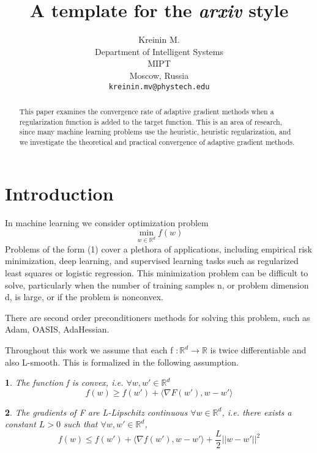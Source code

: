 \documentclass{article}
\title{A template for the \emph{arxiv} style}
\author{ Kreinin M. \\
	Department of Intelligent Systems\\
	MIPT\\
	Moscow, Russia \\
	\texttt{kreinin.mv@phystech.edu} \\
}
\date{}
\makeatletter
\newtheorem*{assumption*}{\assumptionnumber}
\providecommand{\assumptionnumber}{}
\newenvironment{assumption}[2]
 {%
  \renewcommand{\assumptionnumber}{\textbf{Assumption} #1 ({#2})}%
  \begin{assumption*}%
  \protected@edef\@currentlabel{#1-#2}%
 }
 {%
  \end{assumption*}
 }
\makeatother
\begin{document}
\maketitle

\begin{abstract}
	This paper examines the convergence rate of adaptive gradient methods when a regularization function is added to the target function. This is an area of research, since many machine learning problems use the heuristic, heuristic regularization, and we investigate the theoretical and practical convergence of adaptive gradient methods.
\end{abstract}


\section{Introduction}
In machine learning we consider optimization problem
\begin{equation*}
	\min_{w \in \mathbb{R}^d} f(w)
\end{equation*}
Problems of the form (1) cover a plethora of applications, including empirical risk minimization,
deep learning, and supervised learning tasks such as regularized least squares or logistic regression. This minimization problem can be difficult to solve, particularly when the number of training
samples n, or problem dimension d, is large, or if the problem is nonconvex.

There are second order preconditioners methods for solving this problem, such as Adam, OASIS, AdaHessian. 

Throughout this work we assume that each f $:\mathbb{R}^d \rightarrow \mathbb{R}$ is twice differentiable and also L-smooth. This is formalized in the following assumption.

\begin{assumption}{1}{Convex}
	The function f is convex, i.e. $\forall w, w' \in \mathbb{R}^d$
	\begin{equation}
		f(w) \geq f(w') + \langle \nabla F(w'), w-w' \rangle
	\end{equation}
\end{assumption}

\begin{assumption}{2}{L-smoothness}
	The gradients of F are L-Lipschitz continuous $\forall w \in \mathbb{R}^d$, i.e. there exists a constant $L > 0$ such that $\forall w, w' \in \mathbb{R}^d$,
	\begin{equation*}
		f(w) \leq f(w') + \langle \nabla f(w'), w-w' \rangle + \frac{L}{2} ||w - w'||^2
	\end{equation*}
\end{assumption}
\end{document}
